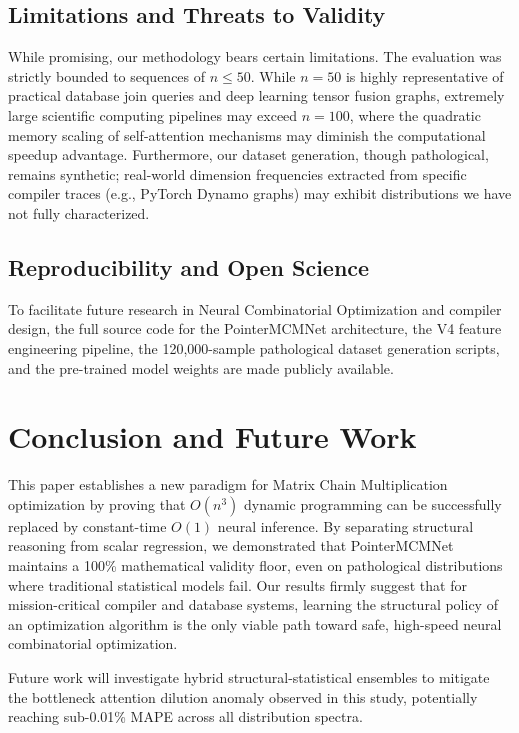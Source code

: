 \documentclass[conference]{IEEEtran}
\begin{document}
\subsection{Limitations and Threats to Validity}
While promising, our methodology bears certain limitations. The evaluation was strictly bounded to sequences of $n \le 50$. While $n=50$ is highly representative of practical database join queries and deep learning tensor fusion graphs, extremely large scientific computing pipelines may exceed $n=100$, where the quadratic memory scaling of self-attention mechanisms may diminish the computational speedup advantage. Furthermore, our dataset generation, though pathological, remains synthetic; real-world dimension frequencies extracted from specific compiler traces (e.g., PyTorch Dynamo graphs) may exhibit distributions we have not fully characterized.

\subsection{Reproducibility and Open Science}
To facilitate future research in Neural Combinatorial Optimization and compiler design, the full source code for the PointerMCMNet architecture, the V4 feature engineering pipeline, the 120,000-sample pathological dataset generation scripts, and the pre-trained model weights are made publicly available.

\section{Conclusion and Future Work}
This paper establishes a new paradigm for Matrix Chain Multiplication optimization by proving that $O(n^3)$ dynamic programming can be successfully replaced by constant-time $O(1)$ neural inference. By separating structural reasoning from scalar regression, we demonstrated that PointerMCMNet maintains a 100\% mathematical validity floor, even on pathological distributions where traditional statistical models fail. Our results firmly suggest that for mission-critical compiler and database systems, learning the structural policy of an optimization algorithm is the only viable path toward safe, high-speed neural combinatorial optimization.

Future work will investigate hybrid structural-statistical ensembles to mitigate the bottleneck attention dilution anomaly observed in this study, potentially reaching sub-0.01\% MAPE across all distribution spectra.
\end{document}
